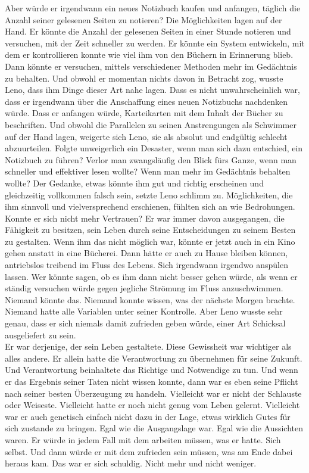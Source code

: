 \documentclass[ngerman,smalldemyvopaper,11pt,oneside,onecolumn,openright,extrafontsizes]{memoir}
\begin{document}
Aber würde er irgendwann ein neues Notizbuch kaufen und anfangen, täglich die Anzahl seiner gelesenen Seiten zu notieren? Die Möglichkeiten lagen auf der Hand. Er könnte die Anzahl der gelesenen Seiten in einer Stunde notieren und versuchen, mit der Zeit schneller zu werden. Er könnte ein System entwickeln, mit dem er kontrollieren konnte wie viel ihm von den Büchern in Erinnerung blieb. Dann könnte er versuchen, mittels verschiedener Methoden mehr im Gedächtnis zu behalten. Und obwohl er momentan nichts davon in Betracht zog, wusste Leno, dass ihm Dinge dieser Art nahe lagen. Dass es nicht unwahrscheinlich war, dass er irgendwann über die Anschaffung eines neuen Notizbuchs nachdenken würde. Dass er anfangen würde, Karteikarten mit dem Inhalt der Bücher zu beschriften. Und obwohl die Parallelen zu seinen Anstrengungen als Schwimmer auf der Hand lagen, weigerte sich Leno, sie als absolut und endgültig schlecht abzuurteilen. Folgte unweigerlich ein Desaster, wenn man sich dazu entschied, ein Notizbuch zu führen? Verlor man zwangsläufig den Blick fürs Ganze, wenn man schneller und effektiver lesen wollte? Wenn man mehr im Gedächtnis behalten wollte? Der Gedanke, etwas könnte ihm gut und richtig erscheinen und gleichzeitig vollkommen falsch sein, setzte Leno schlimm zu. Möglichkeiten, die ihm sinnvoll und vielversprechend erschienen, fühlten sich an wie Bedrohungen. Konnte er sich nicht mehr Vertrauen? Er war immer davon ausgegangen, die Fähigkeit zu besitzen, sein Leben durch seine Entscheidungen zu seinem Besten zu gestalten. Wenn ihm das nicht möglich war, könnte er jetzt auch in ein Kino gehen anstatt in eine Bücherei. Dann hätte er auch zu Hause bleiben können, antriebslos treibend im Fluss des Lebens. Sich irgendwann irgendwo anspülen lassen. Wer könnte sagen, ob es ihm dann nicht besser gehen würde, als wenn er ständig versuchen würde gegen jegliche Strömung im Fluss anzuschwimmen. Niemand könnte das. Niemand konnte wissen, was der nächste Morgen brachte. Niemand hatte alle Variablen unter seiner Kontrolle. Aber Leno wusste sehr genau, dass er sich niemals damit zufrieden geben würde, einer Art Schicksal ausgeliefert zu sein.\\
Er war derjenige, der sein Leben gestaltete. Diese Gewissheit war wichtiger als alles andere. Er allein hatte die Verantwortung zu übernehmen für seine Zukunft. Und Verantwortung beinhaltete das Richtige und Notwendige zu tun. Und wenn er das Ergebnis seiner Taten nicht wissen konnte, dann war es eben seine Pflicht nach seiner besten Überzeugung zu handeln. Vielleicht war er nicht der Schlauste oder Weiseste. Vielleicht hatte er noch nicht genug vom Leben gelernt. Vielleicht war er auch genetisch einfach nicht dazu in der Lage, etwas wirklich Gutes für sich zustande zu bringen. Egal wie die Ausgangslage war. Egal wie die Aussichten waren. Er würde in jedem Fall mit dem arbeiten müssen, was er hatte. Sich selbst. Und dann würde er mit dem zufrieden sein müssen, was am Ende dabei heraus kam. Das war er sich schuldig. Nicht mehr und nicht weniger.\\
\end{document}
